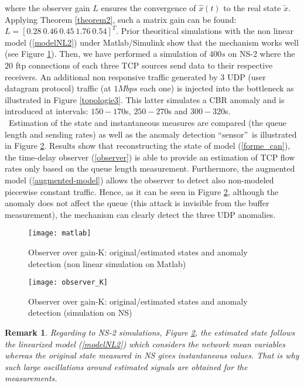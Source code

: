\documentclass[a4paper, 10pt, onecolumn]{article}
\newtheorem{remark}{Remark}
\begin{document}
where the observer gain $L$ ensures the convergence of $\hat{x}(t)$ to the real state $\tilde{x}$. Applying Theorem \ref{theorem2}, such a matrix gain can be found: $L=\left[0.28~0.46~0.45~1.76~0.54\right]^T$. Prior theoritical simulations with the non linear model (\ref{modelNL2}) under Matlab/Simulink show that the mechanism works well (see Figure \ref{matlab}). Then, we have performed a simulation of $400s$ on NS-2 where the $20$ ftp connections of each three TCP sources send data to their respective receivers. An additional non responsive traffic generated by $3$ UDP (user datagram protocol) traffic (at $1Mbps$ each one) is injected into the bottleneck as illustrated in Figure \ref{topologie3}. This latter simulates a CBR anomaly and is introduced at intervals: $150-170$s, $250-270$s and $300-320$s.\\
~\indent Estimation of the state and instantaneous measures are compared (the queue length and sending rates) as well as the anomaly detection \textquotedblleft sensor\textquotedblright  ~is illustrated in Figure \ref{observer_K}. Results show that reconstructing the state of model (\ref{forme_can}), the time-delay observer (\ref{observer}) is able to provide an estimation of TCP flow rates only based on the queue length measurement. Furthermore, the augmented model (\ref{augmented-model}) allows the observer to detect also non-modeled piecewise constant traffic. Hence, as it can be seen in Figure \ref{observer_K}, although the anomaly does not affect the queue (this attack is invisible from the buffer measurement), the mechanism can clearly detect the three UDP anomalies.

\begin{figure}
       \centerline{\texttt{[image: matlab]}}
\vspace*{-1cm}
       \caption{Observer over gain-K: original/estimated states and anomaly detection (non linear simulation on Matlab)}
       \label{matlab}
\end{figure}
\begin{figure}
       \centerline{\texttt{[image: observer\_K]}}
\vspace*{-1.2cm}
       \caption{Observer over gain-K: original/estimated states and anomaly detection (simulation on NS)}
       \label{observer_K}
\end{figure}

\begin{remark}
Regarding to NS-2 simulations, Figure \ref{observer_K}, the estimated state follows the linearized model (\ref{modelNL2}) which considers the network mean variables whereas the original state measured in NS gives instantaneous values. That is why such large oscillations around estimated signals are obtained for the measurements.
\end{remark}
\end{document}
